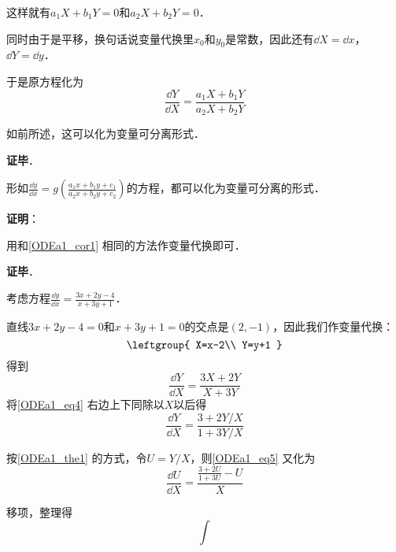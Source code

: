 这样就有$a_1X+b_1Y=0$和$a_2X+b_2Y=0$．

同时由于是平移，换句话说变量代换里$x_0$和$y_0$是常数，因此还有$\dd X=\dd x$，$\dd Y=\dd y$．

于是原方程化为
\begin{equation}
\frac{\dd Y}{\dd X}=\frac{a_1X+b_1Y}{a_2X+b_2Y}
\end{equation}

如前所述，这可以化为变量可分离形式．

\textbf{证毕}．

\begin{corollary}{}
形如$\frac{\dd y}{\dd x}=g(\frac{a_1x+b_1y+c_1}{a_2x+b_2y+c_2})$的方程，都可以化为变量可分离的形式．
\end{corollary}

\textbf{证明}：

用和\autoref{ODEa1_cor1} 相同的方法作变量代换即可．

\textbf{证毕}．





\begin{example}{}
考虑方程$\frac{\dd y}{\dd x}=\frac{3x+2y-4}{x+3y+1}$．

直线$3x+2y-4=0$和$x+3y+1=0$的交点是$(2, -1)$，因此我们作变量代换：
\begin{equation}
\leftgroup{
    X=x-2\\
    Y=y+1
}
\end{equation}
得到
\begin{equation}\label{ODEa1_eq4}
\frac{\dd Y}{\dd X}=\frac{3X+2Y}{X+3Y}
\end{equation}
将\autoref{ODEa1_eq4} 右边上下同除以$X$以后得
\begin{equation}\label{ODEa1_eq5}
\frac{\dd Y}{\dd X}=\frac{3+2Y/X}{1+3Y/X}
\end{equation}

按\autoref{ODEa1_the1} 的方式，令$U=Y/X$，则\autoref{ODEa1_eq5} 又化为
\begin{equation}
\frac{\dd U}{\dd X}=\frac{\frac{3+2U}{1+3U}-U}{X}
\end{equation}

移项，整理得
\begin{equation}
\int
\end{equation}

\end{example}








